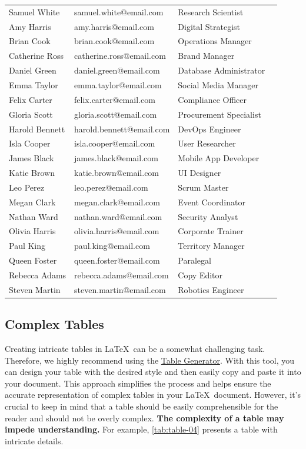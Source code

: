{\begin{longtable}[c]{llll}
Samuel White & samuel.white@email.com & Research Scientist \\ 
Amy Harris & amy.harris@email.com & Digital Strategist \\
Brian Cook & brian.cook@email.com & Operations Manager \\
Catherine Ross & catherine.ross@email.com & Brand Manager \\
Daniel Green & daniel.green@email.com & Database Administrator \\
Emma Taylor & emma.taylor@email.com & Social Media Manager \\
Felix Carter & felix.carter@email.com & Compliance Officer \\
Gloria Scott & gloria.scott@email.com & Procurement Specialist \\
Harold Bennett & harold.bennett@email.com & DevOps Engineer \\
Isla Cooper & isla.cooper@email.com & User Researcher \\
James Black & james.black@email.com & Mobile App Developer \\
Katie Brown & katie.brown@email.com & UI Designer \\
Leo Perez & leo.perez@email.com & Scrum Master \\
Megan Clark & megan.clark@email.com & Event Coordinator \\
Nathan Ward & nathan.ward@email.com & Security Analyst \\
Olivia Harris & olivia.harris@email.com & Corporate Trainer \\
Paul King & paul.king@email.com & Territory Manager \\
Queen Foster & queen.foster@email.com & Paralegal \\
Rebecca Adams & rebecca.adams@email.com & Copy Editor \\
Steven Martin & steven.martin@email.com & Robotics Engineer \\
\end{longtable}

\subsection{Complex Tables}
Creating intricate tables in \LaTeX\ can be a somewhat challenging task. Therefore, we highly recommend using the \href{https://www.tablesgenerator.com/}{Table Generator}. With this tool, you can design your table with the desired style and then easily copy and paste it into your document. This approach simplifies the process and helps ensure the accurate representation of complex tables in your \LaTeX\ document. However, it's crucial to keep in mind that a table should be easily comprehensible for the reader and should not be overly complex. \textbf{The complexity of a table may impede understanding.} For example, \autoref{tab:table-04} presents a table with intricate details.

}
